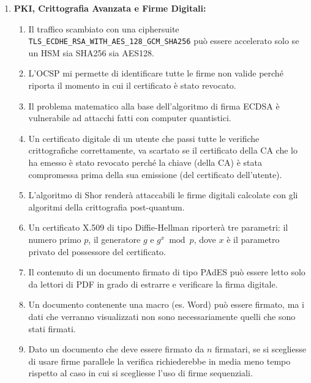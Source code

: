 \documentclass[11pt,a4paper]{article}
\begin{document}
\begin{questionbox}
\begin{enumerate}[label=\textbf{1.\arabic*}]
    \item \textbf{PKI, Crittografia Avanzata e Firme Digitali:}
    \begin{enumerate}[label=\alph*.]
        \item Il traffico scambiato con una ciphersuite \texttt{TLS\_ECDHE\_RSA\_WITH\_AES\_128\_GCM\_SHA256} pu\`o essere accelerato solo se un HSM sia SHA256 sia AES128.
        \item L'OCSP mi permette di identificare tutte le firme non valide perch\'e riporta il momento in cui il certificato \`e stato revocato.
        \item Il problema matematico alla base dell'algoritmo di firma ECDSA \`e vulnerabile ad attacchi fatti con computer quantistici.
        \item Un certificato digitale di un utente che passi tutte le verifiche crittografiche correttamente, va scartato se il certificato della CA che lo ha emesso \`e stato revocato perch\'e la chiave (della CA) \`e stata compromessa prima della sua emissione (del certificato dell'utente).
        \item L'algoritmo di Shor render\`a attaccabili le firme digitali calcolate con gli algoritmi della crittografia post-quantum.
        \item Un certificato X.509 di tipo Diffie-Hellman riporter\`a tre parametri: il numero primo $p$, il generatore $g$ e $g^x \bmod p$, dove $x$ \`e il parametro privato del possessore del certificato.
        \item Il contenuto di un documento firmato di tipo PAdES pu\`o essere letto solo da lettori di PDF in grado di estrarre e verificare la firma digitale.
        \item Un documento contenente una macro (es. Word) pu\`o essere firmato, ma i dati che verranno visualizzati non sono necessariamente quelli che sono stati firmati.
        \item Dato un documento che deve essere firmato da $n$ firmatari, se si scegliesse di usare firme parallele la verifica richiederebbe in media meno tempo rispetto al caso in cui si scegliesse l'uso di firme sequenziali.
    \end{enumerate}


\end{enumerate}
\end{questionbox}
\end{document}
